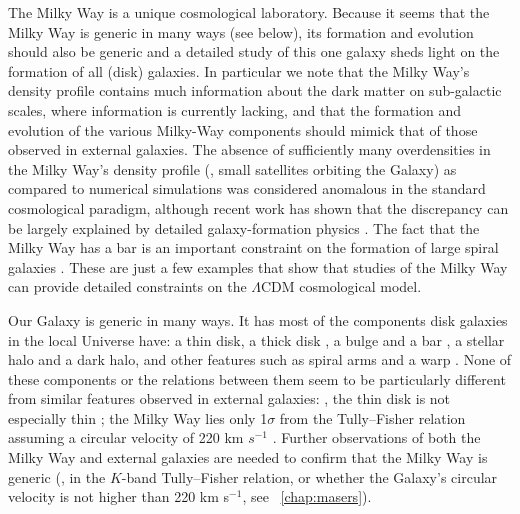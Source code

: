 The Milky Way is a unique cosmological laboratory. Because it seems
that the Milky Way is generic in many ways (see below), its formation
and evolution should also be generic and a detailed study of this one
galaxy sheds light on the formation of all (disk) galaxies. In
particular we note that the Milky Way's density profile contains much
information about the dark matter on sub-galactic scales, where
information is currently lacking, and that the formation and evolution
of the various Milky-Way components should mimick that of those
observed in external galaxies. The absence of sufficiently many
overdensities in the Milky Way's density profile (\ie, small
satellites orbiting the Galaxy) as compared to numerical
simulations \citep{Klypin99a,Moore99a} was considered anomalous in the
standard cosmological paradigm, although recent work has shown that
the discrepancy can be largely explained by detailed galaxy-formation
physics \citep[\eg,][]{Koposov:2009ru}. The fact that the Milky Way
has a bar is an important constraint on the formation of large spiral
galaxies \citep{Klypin02a}. These are just a few examples that show
that studies of the Milky Way can provide detailed constraints on the
$\Lambda$CDM cosmological model.

Our Galaxy is generic in many ways. It has most of the components disk
galaxies in the local Universe have: a thin disk, a thick
disk \citep{1983MNRAS.202.1025G}, a bulge and a bar \citep{Blitz91a},
a stellar halo \citep{Freeman87a} and a dark halo, and other features
such as spiral arms \citep{Georgelin76a} and a
warp \citep{Levine06a,Reyle09a}. None of these components or the
relations between them seem to be particularly different from similar
features observed in external galaxies: \eg, the thin disk is not
especially thin \citep{Juric08a}; the Milky Way lies only 1$\sigma$ from
the Tully--Fisher relation assuming a circular velocity of 220 km
$s^{-1}$ \citep{Flynn06a}. Further observations of both the Milky Way
and external galaxies are needed to confirm that the Milky Way is
generic (\eg, in the $K$-band Tully--Fisher relation, or whether the
Galaxy's circular velocity is not higher than 220 km s$^{-1}$,
see \chaptername~\ref{chap:masers}).

